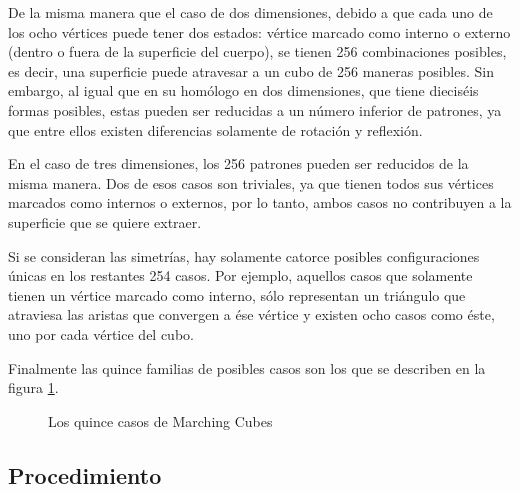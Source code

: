 De la misma manera que el caso de dos dimensiones, debido a que cada uno de los ocho
vértices puede tener dos estados: vértice marcado como interno o externo (dentro o fuera de la
superficie del cuerpo), se tienen 256 combinaciones posibles, es decir, una superficie puede
atravesar a un cubo de 256 maneras posibles. Sin embargo, al igual que en su homólogo en dos
dimensiones, que tiene dieciséis formas posibles, estas pueden ser reducidas a un número inferior
de patrones, ya que entre ellos existen diferencias solamente de rotación y reflexión.

En el caso de tres dimensiones, los 256 patrones pueden ser reducidos de la misma
manera. Dos de esos casos son triviales, ya que tienen todos sus vértices marcados como internos
o externos, por lo tanto, ambos casos no contribuyen a la superficie que se quiere extraer.

Si se consideran las simetrías, hay solamente catorce posibles configuraciones únicas en
los restantes 254 casos. Por ejemplo, aquellos casos que solamente tienen un vértice marcado
como interno, sólo representan un triángulo que atraviesa las aristas que convergen a ése vértice y
existen ocho casos como éste, uno por cada vértice del cubo.

Finalmente las quince familias de posibles casos son los que se describen en la figura \ref{f:estadoDelArte:Shu95adaptivemarching_1}.

\begin{figure}[hbp]
\centering
\caption[Los quince casos de Marching Cubes]{Los quince casos de Marching Cubes \cite{Shu95adaptivemarching}}
\label{f:estadoDelArte:Shu95adaptivemarching_1}
\end{figure}

\newpage
\subsection{Procedimiento}
\label{subsec:marchingCubes:procedimiento}

